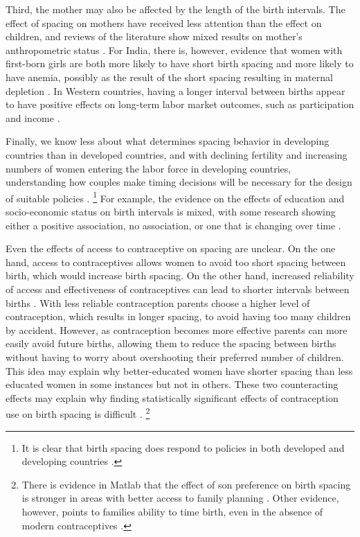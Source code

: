 \documentclass[12pt,letterpaper]{article}
\begin{document}
Third, the mother may also be affected by the length of the birth intervals.
The effect of spacing on mothers have received less attention than the effect on children, 
and reviews of the literature show mixed results on mother's anthropometric status 
\citep{Dewey2007,Conde-Agudelo2012}.
For India, there is, however, evidence that women with first-born girls are both
more likely to have short birth spacing and more likely to have anemia, possibly as
the result of the short spacing resulting in maternal depletion \citep{Milazzo2018}.
In Western countries, having a longer interval between births appear to have positive
effects on long-term labor market outcomes, such as participation and 
income \citep{Gough2017,Karimi2014}.

Finally, we know less about what determines spacing behavior in developing countries than 
in developed countries, and with declining fertility and increasing numbers of women 
entering the labor force in developing countries, understanding how couples make timing 
decisions will be necessary for the design of suitable policies \citep{Portner2018}.%
\footnote{
It is clear that birth spacing does respond to policies in both developed and 
developing countries \citep{Pettersson-Lidbom2009,Todd2012,Meckel2015,Ghosh2018}.
}
For example, the evidence on the effects of education and socio-economic status on
birth intervals is mixed, with some research showing either a positive association, no
association, or one that is changing over time 
\citep{Tulasidhar1993,Whitworth2002,Bhalotra2008,Kim2010,Soest2018}.

Even the effects of access to contraceptive on spacing are unclear.
On the one hand, access to contraceptives allows women to avoid too short spacing between 
birth, which would increase birth spacing.
On the other hand, increased reliability of access and effectiveness of contraceptives can 
lead to shorter intervals between births  \citep{Keyfitz1971,Heckman1976}.
With less reliable contraception parents choose a higher level of contraception, which 
results in longer spacing, to avoid having too many children by accident.
However, as contraception becomes more effective parents can more easily avoid future 
births, allowing them to reduce the spacing between births without having to worry about 
overshooting their preferred number of children.
This idea may explain why better-educated women have shorter spacing than less educated 
women in some instances but not in others.
These two counteracting effects may explain why finding statistically significant effects 
of contraception use on birth spacing is difficult \citep{Yeakey2009}.%
\footnote{
There is evidence in Matlab that the effect of son preference on birth spacing is
stronger in areas with better access to family planning \citep{Rahman1993}.
Other evidence, however, points to families ability to time birth, even in the absence
of modern contraceptives \citep{Jayachandran2011,Alam2018}.
}
\end{document}
